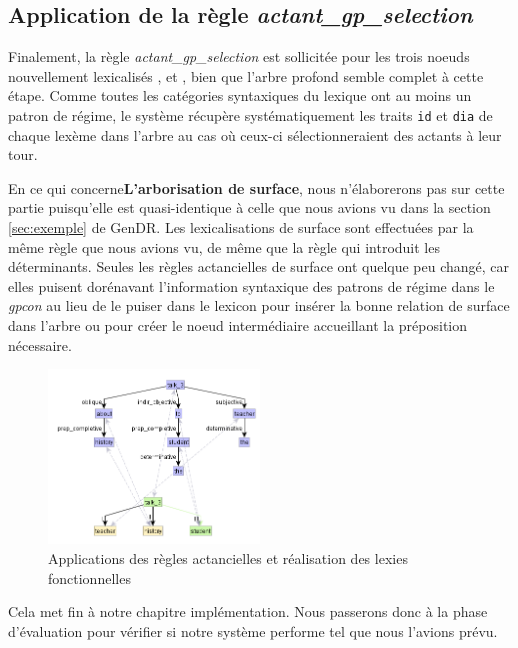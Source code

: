 \subsection{Application de la règle \emph{actant\_gp\_selection}}
Finalement, la règle \emph{actant\_gp\_selection} est sollicitée pour les trois noeuds nouvellement lexicalisés , et , bien que l'arbre profond semble complet à cette étape. Comme toutes les catégories syntaxiques du lexique ont au moins un patron de régime, le système récupère systématiquement les traits \texttt{id} et \texttt{dia} de chaque lexème dans l'arbre au cas où ceux-ci sélectionneraient des actants à leur tour. 

En ce qui concerne\textbf{L'arborisation de surface}, nous n'élaborerons pas sur cette partie puisqu'elle est quasi-identique à celle que nous avions vu dans la section \ref{sec:exemple} de GenDR. Les lexicalisations de surface sont effectuées par la même règle que nous avions vu, de même que la règle qui introduit les déterminants. Seules les règles actancielles de surface ont quelque peu changé, car elles puisent dorénavant l'information syntaxique des patrons de régime dans le \emph{gpcon} au lieu de le puiser dans le lexicon pour insérer la bonne relation de surface dans l'arbre ou pour créer le noeud intermédiaire accueillant la préposition nécessaire.

\begin{figure}[htb]
	\centering
	\includegraphics[width=0.5\textwidth, trim = {0cm 0cm 0cm 0cm},clip]{ch6/figs/ssynt.png}
	\caption{Applications des règles actancielles et réalisation des lexies fonctionnelles}
	\label{deroulement4}
\end{figure}

Cela met fin à notre chapitre implémentation. Nous passerons donc à la phase d'évaluation pour vérifier si notre système performe tel que nous l'avions prévu.